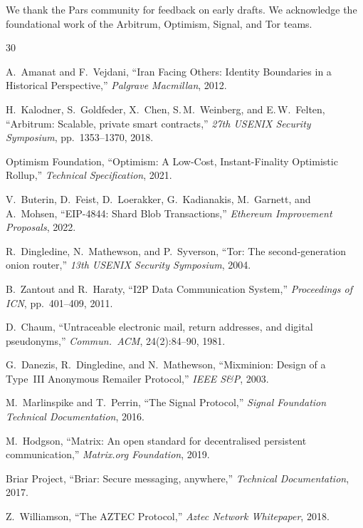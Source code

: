 \documentclass[11pt,a4paper]{article}
\begin{document}
We thank the Pars community for feedback on early drafts.  We acknowledge
the foundational work of the Arbitrum, Optimism, Signal, and Tor teams.


\begin{thebibliography}{30}

A.~Amanat and F.~Vejdani,
``Iran Facing Others: Identity Boundaries in a Historical Perspective,''
\emph{Palgrave Macmillan}, 2012.

H.~Kalodner, S.~Goldfeder, X.~Chen, S.\,M.~Weinberg, and E.\,W.~Felten,
``Arbitrum: Scalable, private smart contracts,''
\emph{27th USENIX Security Symposium}, pp.~1353--1370, 2018.

Optimism Foundation,
``Optimism: A Low-Cost, Instant-Finality Optimistic Rollup,''
\emph{Technical Specification}, 2021.

V.~Buterin, D.~Feist, D.~Loerakker, G.~Kadianakis, M.~Garnett, and
A.~Mohsen,
``EIP-4844: Shard Blob Transactions,''
\emph{Ethereum Improvement Proposals}, 2022.

R.~Dingledine, N.~Mathewson, and P.~Syverson,
``Tor: The second-generation onion router,''
\emph{13th USENIX Security Symposium}, 2004.

B.~Zantout and R.~Haraty,
``I2P Data Communication System,''
\emph{Proceedings of ICN}, pp.~401--409, 2011.

D.~Chaum,
``Untraceable electronic mail, return addresses, and digital pseudonyms,''
\emph{Commun.\ ACM}, 24(2):84--90, 1981.

G.~Danezis, R.~Dingledine, and N.~Mathewson,
``Mixminion: Design of a Type~III Anonymous Remailer Protocol,''
\emph{IEEE S\&P}, 2003.

M.~Marlinspike and T.~Perrin,
``The Signal Protocol,''
\emph{Signal Foundation Technical Documentation}, 2016.

M.~Hodgson,
``Matrix: An open standard for decentralised persistent communication,''
\emph{Matrix.org Foundation}, 2019.

Briar Project,
``Briar: Secure messaging, anywhere,''
\emph{Technical Documentation}, 2017.

Z.~Williamson,
``The AZTEC Protocol,''
\emph{Aztec Network Whitepaper}, 2018.


\end{thebibliography}
\end{document}
